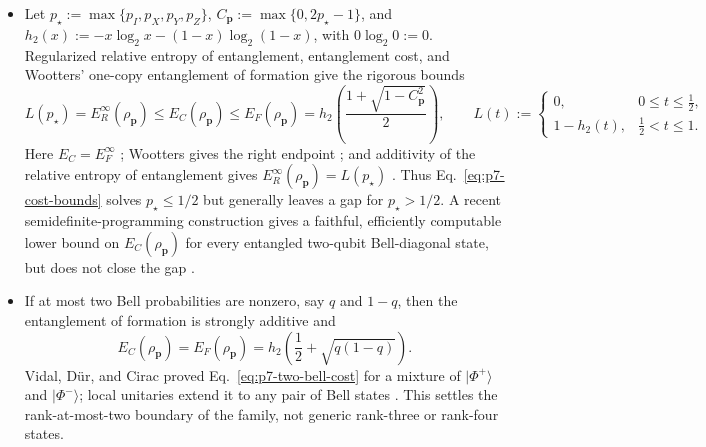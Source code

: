 \begin{itemize}
  \item Let $p_\star:=\max\{p_I,p_X,p_Y,p_Z\}$,
  $C_{\mathbf p}:=\max\{0,2p_\star-1\}$, and
  $h_2(x):=-x\log_2x-(1-x)\log_2(1-x)$, with $0\log_2 0:=0$.  Regularized relative entropy of
  entanglement, entanglement cost, and Wootters' one-copy entanglement of
  formation give the rigorous bounds
  \begin{equation}
    L(p_\star)=E_R^\infty(\rho_{\mathbf p})
    \leq E_C(\rho_{\mathbf p})
    \leq E_F(\rho_{\mathbf p})
    =h_2\!\left(\frac{1+\sqrt{1-C_{\mathbf p}^{2}}}{2}\right),
    \qquad
    L(t):=
    \begin{cases}
      0, & 0\leq t\leq\tfrac12,\\
      1-h_2(t), & \tfrac12<t\leq1.
    \end{cases}
    \label{eq:p7-cost-bounds}
  \end{equation}
  Here $E_C=E_F^\infty$
  ; Wootters gives the
  right endpoint ; and additivity of the
  relative entropy of entanglement gives
  $E_R^\infty(\rho_{\mathbf p})=L(p_\star)$
  .  Thus
  Eq.~\eqref{eq:p7-cost-bounds} solves $p_\star\leq1/2$ but generally leaves
  a gap for $p_\star>1/2$.  A recent semidefinite-programming construction
  gives a faithful, efficiently computable lower bound on
  $E_C(\rho_{\mathbf p})$ for every entangled two-qubit Bell-diagonal state,
  but does not close the gap
  .

  \item If at most two Bell probabilities are nonzero, say $q$ and
  $1-q$, then the entanglement of formation is strongly additive and
  \begin{equation}
    E_C(\rho_{\mathbf p})=E_F(\rho_{\mathbf p})
    =h_2\!\left(\frac12+\sqrt{q(1-q)}\right).
    \label{eq:p7-two-bell-cost}
  \end{equation}
  Vidal, D\"ur, and Cirac proved Eq.~\eqref{eq:p7-two-bell-cost} for a
  mixture of $\lvert\Phi^+\rangle$ and $\lvert\Phi^-\rangle$; local
  unitaries extend it to any pair of Bell states
  .  This settles the rank-at-most-two
  boundary of the family, not generic rank-three or rank-four states.


\end{itemize}
